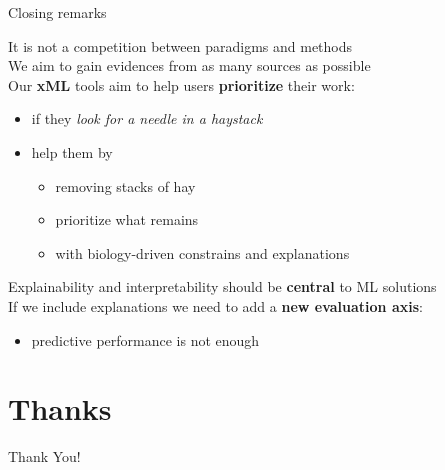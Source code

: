 \documentclass[compress,ignorenonframetext,aspectratio=1610,handout]{beamer}
\begin{document}
\begin{frame}{Closing remarks}
	
	It is not a competition between paradigms and methods \\

	We aim to gain evidences from as many sources as possible \\

	Our \textbf{xML} tools aim to help users \textbf{prioritize} their work:
	\begin{itemize}
		\item if they \textit{look for a needle in a haystack}
		\item help them by
		\begin{itemize}
			\item removing stacks of hay
			\item prioritize what remains
			\item with biology-driven constrains and explanations
		\end{itemize}
	\end{itemize}

	Explainability and interpretability should be \textbf{central} to ML solutions \\

	If we include explanations we need to add a \textbf{new evaluation axis}:
	\begin{itemize}
		\item predictive performance is not enough
	\end{itemize}

\end{frame}



\section{Thanks}

	\begin{frame}{}
		\begin{center}
			{\fontsize{40}{50}\selectfont Thank You!}
		\end{center}
	\end{frame}
\end{document}
